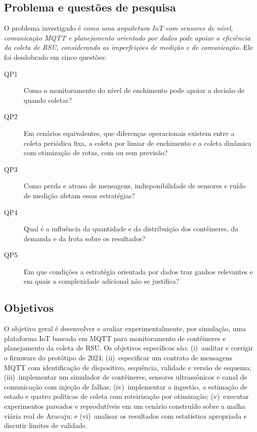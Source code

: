 \subsection{Problema e questões de pesquisa}

O problema investigado é \emph{como uma arquitetura IoT com sensores de nível,
comunicação MQTT e planejamento orientado por dados pode apoiar a eficiência
da coleta de RSU, considerando as imperfeições de medição e de comunicação}.
Ele foi desdobrado em cinco questões:

\begin{description}
  \item[QP1] Como o monitoramento do nível de enchimento pode apoiar a decisão
  de quando coletar?
  \item[QP2] Em cenários equivalentes, que diferenças operacionais existem entre
  a coleta periódica fixa, a coleta por limiar de enchimento e a coleta
  dinâmica com otimização de rotas, com ou sem previsão?
  \item[QP3] Como perda e atraso de mensagens, indisponibilidade de sensores e
  ruído de medição afetam essas estratégias?
  \item[QP4] Qual é a influência da quantidade e da distribuição dos
  contêineres, da demanda e da frota sobre os resultados?
  \item[QP5] Em que condições a estratégia orientada por dados traz ganhos
  relevantes e em quais a complexidade adicional não se justifica?
\end{description}

\subsection{Objetivos}

O objetivo geral é desenvolver e avaliar experimentalmente, por simulação, uma
plataforma IoT baseada em MQTT para monitoramento de contêineres e planejamento
da coleta de RSU. Os objetivos específicos são:
(i)~auditar e corrigir o firmware do protótipo de 2024;
(ii)~especificar um contrato de mensagens MQTT com identificação de
dispositivo, sequência, validade e versão de esquema;
(iii)~implementar um simulador de contêineres, sensores ultrassônicos e canal de
comunicação com injeção de falhas;
(iv)~implementar a ingestão, a estimação de estado e quatro políticas de coleta
com roteirização por otimização;
(v)~executar experimentos pareados e reprodutíveis em um cenário construído
sobre a malha viária real de Aracaju; e
(vi)~analisar os resultados com estatística apropriada e discutir limites de
validade.

